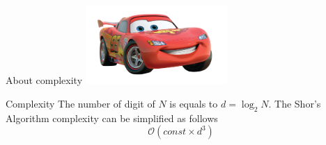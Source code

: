 \documentclass{beamer}
\begin{document}
    \begin{frame}{About complexity}
        \centering
        \includegraphics[height=3cm, keepaspectratio]{images/cars.png}
        \vspace{0.5cm}
        \begin{block}{Complexity}
            The number of digit of $N$ is equals to $d = \log_2N$. The Shor's Algorithm complexity
            can be simplified as follows
            $$ \mathcal{O}(const \times d^3)$$
        \end{block}
    \end{frame}

    
    
\end{document}
